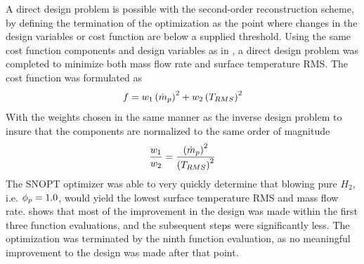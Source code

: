 A direct design problem is possible with the second-order reconstruction scheme,
by defining the termination of the optimization as the point where changes in the
design variables or cost function are below a supplied threshold.  Using the
same cost function components and design variables as in ,
a direct design problem was completed to minimize both mass flow rate and
surface temperature RMS.  The cost function was formulated as
\begin{equation}
  f = w_1\left( \dot{m}_p \right)^2 + w_2\left( T_{RMS} \right)^2
  \label{direct-design-cost-func}
\end{equation}
With the weights chosen in the same manner as the inverse design problem to
insure that the components are normalized to the same order of magnitude
\begin{equation}
  \frac{w_1}{w_2} = \frac{\left( \dot{m}_p \right)^2}{\left( T_{RMS} \right)^2}
  \label{direct-design-weights}
\end{equation}
The SNOPT optimizer was able to very quickly determine that blowing pure
$H_2$, i.e. $\phi_p = 1.0$, would yield the lowest surface temperature RMS and mass
flow rate.   shows that most of the improvement in
the design was made within the first three function evaluations, and the
subsequent steps were significantly less.  The optimization was terminated by
the ninth function evaluation, as no meaningful improvement to the design was
made after that point.
